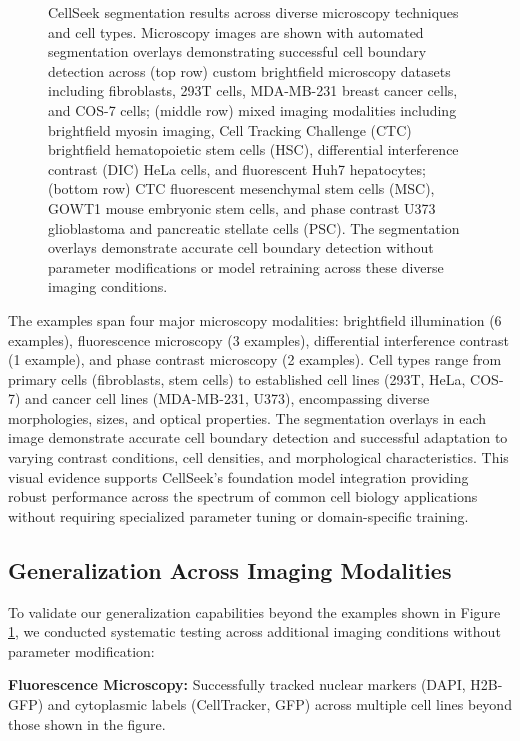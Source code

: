 \documentclass[../cellseek_paper.tex]{subfiles}
\begin{document}
\begin{figure}[H]
  \caption{CellSeek segmentation results across diverse microscopy techniques and cell types. Microscopy images are shown with automated segmentation overlays demonstrating successful cell boundary detection across (top row) custom brightfield microscopy datasets including fibroblasts, 293T cells, MDA-MB-231 breast cancer cells, and COS-7 cells; (middle row) mixed imaging modalities including brightfield myosin imaging, Cell Tracking Challenge (CTC) brightfield hematopoietic stem cells (HSC), differential interference contrast (DIC) HeLa cells, and fluorescent Huh7 hepatocytes; (bottom row) CTC fluorescent mesenchymal stem cells (MSC), GOWT1 mouse embryonic stem cells, and phase contrast U373 glioblastoma and pancreatic stellate cells (PSC). The segmentation overlays demonstrate accurate cell boundary detection without parameter modifications or model retraining across these diverse imaging conditions.}
  \label{fig:generalization_examples}
\end{figure}

The examples span four major microscopy modalities: brightfield illumination (6 examples), fluorescence microscopy (3 examples), differential interference contrast (1 example), and phase contrast microscopy (2 examples). Cell types range from primary cells (fibroblasts, stem cells) to established cell lines (293T, HeLa, COS-7) and cancer cell lines (MDA-MB-231, U373), encompassing diverse morphologies, sizes, and optical properties. The segmentation overlays in each image demonstrate accurate cell boundary detection and successful adaptation to varying contrast conditions, cell densities, and morphological characteristics. This visual evidence supports CellSeek's foundation model integration providing robust performance across the spectrum of common cell biology applications without requiring specialized parameter tuning or domain-specific training.

\subsection{Generalization Across Imaging Modalities}

To validate our generalization capabilities beyond the examples shown in Figure \ref{fig:generalization_examples}, we conducted systematic testing across additional imaging conditions without parameter modification:

\textbf{Fluorescence Microscopy:} Successfully tracked nuclear markers (DAPI, H2B-GFP) and cytoplasmic labels (CellTracker, GFP) across multiple cell lines beyond those shown in the figure.
\end{document}
